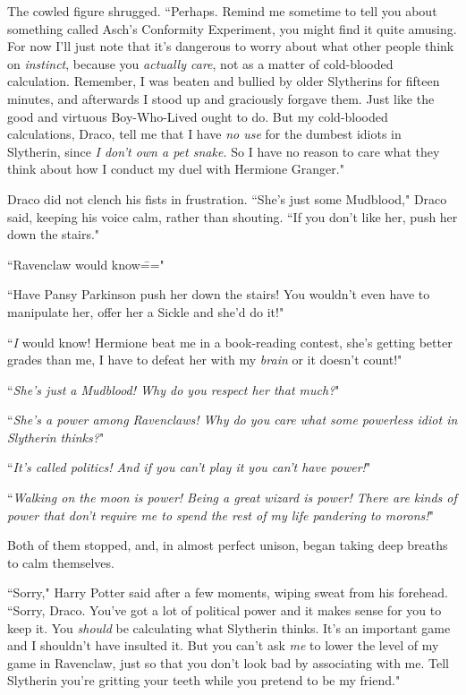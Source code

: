 The cowled figure shrugged. ``Perhaps. Remind me sometime to tell you about something called Asch's Conformity Experiment, you might find it quite amusing. For now I'll just note that it's dangerous to worry about what other people think on \emph{instinct}, because you \emph{actually care}, not as a matter of cold-blooded calculation. Remember, I was beaten and bullied by older Slytherins for fifteen minutes, and afterwards I stood up and graciously forgave them. Just like the good and virtuous Boy-Who-Lived ought to do. But my cold-blooded calculations, Draco, tell me that I have \emph{no use} for the dumbest idiots in Slytherin, since \emph{I don't own a pet snake.} So I have no reason to care what they think about how I conduct my duel with Hermione Granger."

Draco did not clench his fists in frustration. ``She's just some Mudblood," Draco said, keeping his voice calm, rather than shouting. ``If you don't like her, push her down the stairs."

``Ravenclaw would know\==="

``Have Pansy Parkinson push her down the stairs! You wouldn't even have to manipulate her, offer her a Sickle and she'd do it!"

``\emph{I} would know! Hermione beat me in a book-reading contest, she's getting better grades than me, I have to defeat her with my \emph{brain} or it doesn't count!"

``\emph{She's just a Mudblood! Why do you respect her that much?}"

``\emph{She's a power among Ravenclaws! Why do you care what some powerless idiot in Slytherin thinks?}"

``\emph{It's called politics! And if you can't play it you can't have power!}"

``\emph{Walking on the moon is power! Being a great wizard is power! There are kinds of power that don't require me to spend the rest of my life pandering to morons!}"

Both of them stopped, and, in almost perfect unison, began taking deep breaths to calm themselves.

``Sorry," Harry Potter said after a few moments, wiping sweat from his forehead. ``Sorry, Draco. You've got a lot of political power and it makes sense for you to keep it. You \emph{should} be calculating what Slytherin thinks. It's an important game and I shouldn't have insulted it. But you can't ask \emph{me} to lower the level of my game in Ravenclaw, just so that you don't look bad by associating with me. Tell Slytherin you're gritting your teeth while you pretend to be my friend."

